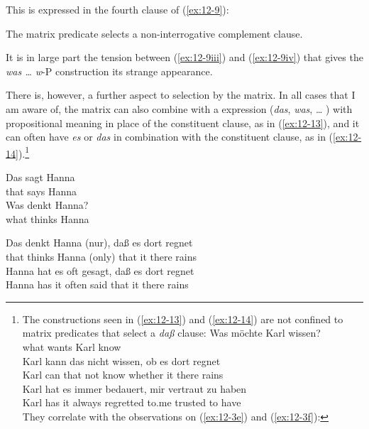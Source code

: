 \documentclass[output=paper]{langsci/langscibook}
\begin{document}
This is expressed in the fourth clause of (\ref{ex:12-9}):
\begin{exe}
\begin{xlist}
{\label{ex:12-9iv}
The matrix predicate selects a non-interrogative complement clause.}
\end{xlist}
\end{exe}
It is in large part the tension between (\ref{ex:12-9iii}) and (\ref{ex:12-9iv}) that gives
the \textit{was \ldots{}  w}-P construction its strange appearance.

There is, however, a further aspect to selection by the matrix. In all
cases that I am aware of, the matrix can also combine with a 
expression (\textit{das}, \textit{was}, \ldots{} ) with propositional meaning in
place of the constituent clause, as in (\ref{ex:12-13}), and it can often have
\textit{es} or \textit{das} in combination with the constituent clause, as
in (\ref{ex:12-14}).\footnote{%
  The constructions seen in (\ref{ex:12-13}) and (\ref{ex:12-14}) are not
  confined to matrix predicates that select a  \textit{daß} clause:
\ea
\label{ex:12-fn4i}
\gll Was möchte Karl wissen?\\     
     what wants Karl know \\
\ex
\label{ex:12-fn4ii}
\gll Karl kann das nicht wissen, ob es dort regnet \\  
     Karl can that not   know whether it there rains \\
\ex
\label{ex:12-fn4iii}
\gll Karl hat es immer bedauert, mir vertraut zu haben \\
     Karl has it always regretted to.me trusted to have \\
\z
They correlate with the observations on (\ref{ex:12-3e}) and (\ref{ex:12-3f}):
\zlast%
}
\begin{exe}
\ex
\label{ex:12-13}
\begin{xlist}
\ex
\label{ex:12-13a}
\gll
Das sagt Hanna \\
that says Hanna \\
\ex
\label{ex:12-13b}
\gll
Was  denkt  Hanna? \\
what thinks Hanna \\
\end{xlist}
\ex
\label{ex:12-14}
\begin{xlist}
\ex
\label{ex:12-14a}
\gll
Das denkt Hanna (nur), daß es dort regnet \\
that thinks Hanna (only) that it there rains \\
\ex
\label{ex:12-14b}
\gll
Hanna hat es oft gesagt, daß es dort regnet \\
Hanna has it often said that it there rains \\
\end{xlist}
\end{exe}
\end{document}
